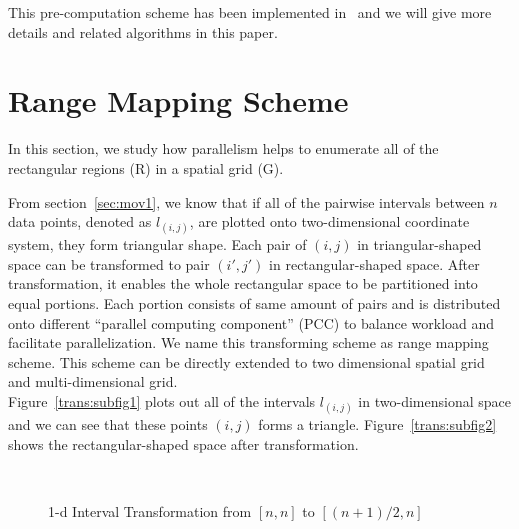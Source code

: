 \documentclass[AMA,LATO1COL]{WileyNJD-v2-bak}
\begin{document}
This pre-computation scheme has been implemented in~\cite{apweb} and we will give more details and related algorithms in this paper.

\section {Range Mapping Scheme} \label{RMS}
In this section, we study how parallelism helps to enumerate all of the rectangular regions (R) in a spatial grid (G).

From section~\ref{sec:mov1}, we know that if all of the pairwise intervals between $n$ data points, denoted as $l_{(i,j)}$, are plotted onto two-dimensional coordinate system, they form triangular shape. Each pair of $(i,j)$ in triangular-shaped space can be transformed to pair $(i',j')$ in rectangular-shaped space. After transformation, it enables the whole rectangular space to be partitioned into equal portions. Each portion consists of same amount of pairs and is distributed onto different ``parallel computing component'' (PCC) to balance workload and facilitate parallelization. We name this transforming scheme as range mapping scheme. This scheme can be directly extended to two dimensional spatial grid and multi-dimensional grid.\\
Figure~\ref{trans:subfig1} plots out all of the intervals $l_{(i,j)}$ in two-dimensional space and we can see that these points $(i,j)$ forms a triangle. Figure~\ref{trans:subfig2} shows the rectangular-shaped space after transformation.

\begin{figure}[h]
\centering
{}
~~
\caption{1-d Interval Transformation from $[n,n]$ to $[(n+1)/2,n]$}\label{modelBF}
\end{figure}
\end{document}
